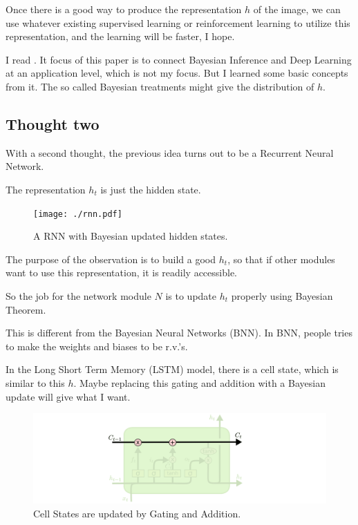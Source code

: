 Once there is a good way to produce the representation $h$ of the image,
we can use whatever existing supervised learning or reinforcement learning to utilize this representation,
and the learning will be faster, I hope.

I read \cite{wang_survey_2020}. It focus of this paper is to connect Bayesian Inference and Deep Learning at an application level, which is not my focus. 
But I learned some basic concepts from it.
The so called Bayesian treatments might give the distribution of $h$.

\subsection{Thought two}

With a second thought, the previous idea turns out to be a Recurrent Neural Network.

The representation $h_t$ is just the hidden state.

\begin{figure}[h]
    \centering
    \texttt{[image: ./rnn.pdf]}
    \caption{A RNN with Bayesian updated hidden states.}
\end{figure}

The purpose of the observation is to build a good $h_t$, 
so that if other modules want to use this representation,
it is readily accessible.

So the job for the network module $N$ is to update $h_t$ properly using Bayesian Theorem.

This is different from the Bayesian Neural Networks (BNN).
In BNN, people tries to make the weights and biases to be r.v.'s.

In the Long Short Term Memory (LSTM) model, there is a cell state, which is similar to this $h$.
Maybe replacing this gating and addition with a Bayesian update will give what I want.

\begin{figure}[h]
    \centering
    \includegraphics[width=.8\textwidth]{./LSTM3-C-line.png}
    \caption{Cell States are updated by Gating and Addition.}
\end{figure}

